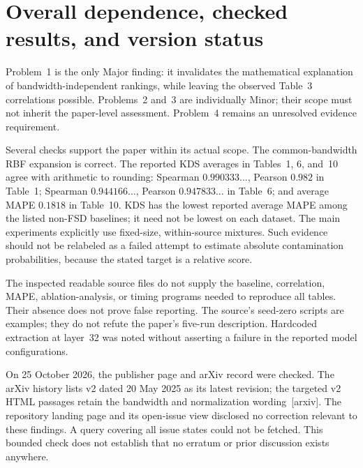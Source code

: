 \documentclass[10pt]{article}
\begin{document}
\section*{Overall dependence, checked results, and version status}
Problem 1 is the only Major finding: it invalidates the mathematical explanation of bandwidth-independent rankings, while leaving the observed Table 3 correlations possible. Problems 2 and 3 are individually Minor; their scope must not inherit the paper-level assessment. Problem 4 remains an unresolved evidence requirement.\par
Several checks support the paper within its actual scope. The common-bandwidth RBF expansion is correct. The reported KDS averages in Tables 1, 6, and 10 agree with arithmetic to rounding: Spearman \(0.990333\ldots\), Pearson \(0.982\) in Table 1; Spearman \(0.944166\ldots\), Pearson \(0.947833\ldots\) in Table 6; and average MAPE \(0.1818\) in Table 10. KDS has the lowest reported average MAPE among the listed non-FSD baselines; it need not be lowest on each dataset. The main experiments explicitly use fixed-size, within-source mixtures. Such evidence should not be relabeled as a failed attempt to estimate absolute contamination probabilities, because the stated target is a relative score.\par
The inspected readable source files do not supply the baseline, correlation, MAPE, ablation-analysis, or timing programs needed to reproduce all tables. Their absence does not prove false reporting. The source’s seed-zero scripts are examples; they do not refute the paper’s five-run description. Hardcoded extraction at layer 32 was noted without asserting a failure in the reported model configurations.\par
On 25 October 2026, the publisher page and arXiv record were checked. The arXiv history lists v2 dated 20 May 2025 as its latest revision; the targeted v2 HTML passages retain the bandwidth and normalization wording [arxiv]. The repository landing page and its open-issue view disclosed no correction relevant to these findings. A query covering all issue states could not be fetched. This bounded check does not establish that no erratum or prior discussion exists anywhere.\par
\end{document}
